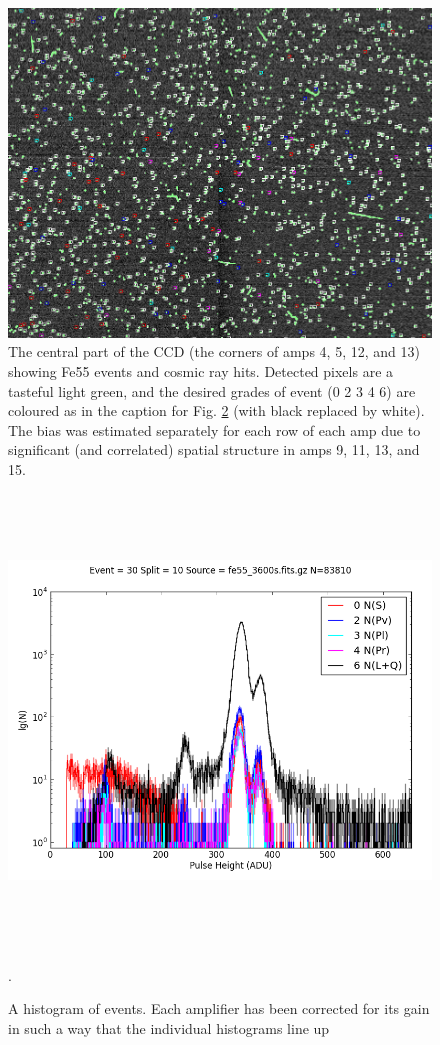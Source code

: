\documentclass[12pt]{article}
\begin{document}
\begin{figure}
  \includegraphics[width=\the\hsize]{fe55-ds9}
  \caption{The central part of the CCD (the corners of amps 4, 5, 12, and 13) showing Fe55 events
    and cosmic ray hits.  Detected
    pixels are a tasteful light green, and the desired grades of event (0 2 3 4 6) are coloured
    as in the caption for Fig. \ref{eventsHistogramGain} (with black replaced by white).  The
    bias was estimated separately for each row of each amp due to significant (and correlated)
    spatial structure in amps 9, 11, 13, and 15.
  }
  \label{ds9Events}
\end{figure}

\begin{figure}
  \hspace*{-10mm}\includegraphics[height=12cm]{fe55-gain}
  \caption{A histogram of events.  Each amplifier has been corrected for its gain in
    such a way that the individual histograms line up
  }
  \label{eventsHistogramGain}.
\end{figure}
\end{document}
